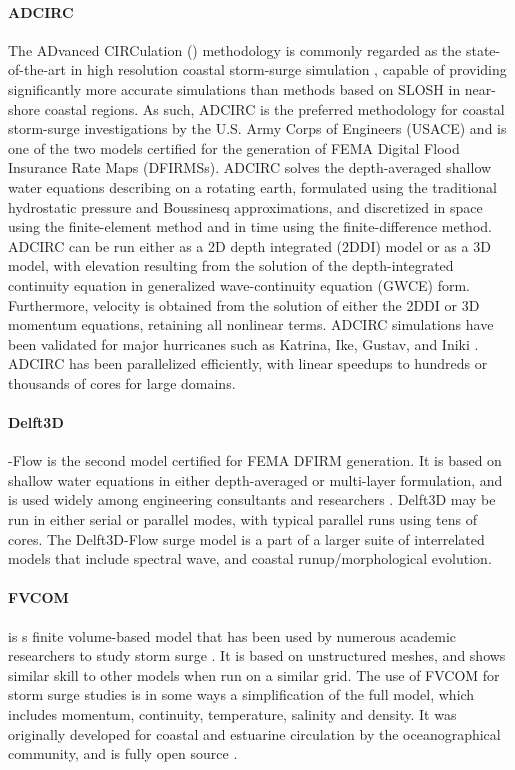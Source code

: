 \paragraph{ADCIRC} The ADvanced CIRCulation () methodology is commonly regarded as the state-of-the-art in high resolution coastal storm-surge simulation \citep{luettich1992adcirc}, capable of providing significantly more accurate simulations than methods based on SLOSH \citep{resio2008modeling} in near-shore coastal regions. As such, ADCIRC is the preferred methodology for coastal storm-surge investigations by the U.S. Army Corps of Engineers (USACE) and is one of the two models certified for the generation of FEMA Digital Flood Insurance Rate Maps (DFIRMSs). ADCIRC solves the depth-averaged shallow water equations describing on a rotating earth, formulated using the traditional hydrostatic pressure and Boussinesq approximations, and discretized in space using the finite-element method and in time using the finite-difference method. ADCIRC can be run either as a 2D depth integrated (2DDI) model or as a 3D model, with elevation resulting from the solution of the depth-integrated continuity equation in generalized wave-continuity equation (GWCE) form. Furthermore, velocity is obtained from the solution of either the 2DDI or 3D momentum equations, retaining all nonlinear terms. ADCIRC simulations have been validated for major hurricanes such as Katrina, Ike, Gustav, and Iniki \citep{kennedy2011origin,kennedy2012tropical}. ADCIRC has been parallelized efficiently, with linear speedups to hundreds or thousands of cores for large domains. 

\paragraph{Delft3D} -Flow is the second model certified for FEMA DFIRM generation. It is based on shallow water equations in either depth-averaged or multi-layer formulation, and is used widely among engineering consultants and researchers \citep{hu2015numerical,vousdoukas2016projections}. Delft3D may be run in either serial or parallel modes, with typical parallel runs using tens of cores. The Delft3D-Flow surge model is a part of a larger suite of interrelated models that include spectral wave, and coastal runup/morphological evolution. 

\paragraph{FVCOM}  is s finite volume-based model that has been used by numerous academic researchers to study storm surge \citep{kerr2013ioos,rego2010storm}. It is based on unstructured meshes, and shows similar skill to other models when run on a similar grid. The use of FVCOM for storm surge studies is in some ways a simplification of the full model, which includes momentum, continuity, temperature, salinity and density. It was originally developed for coastal and estuarine circulation by the oceanographical community, and is fully open source \citep{chen2003unstructured}. 

